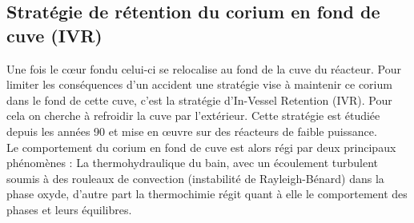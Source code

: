 
\subsection{Stratégie de rétention du corium en fond de cuve (IVR)}
Une fois le c\oe ur fondu celui-ci se relocalise au fond de la cuve du réacteur. Pour limiter les conséquences d'un accident une stratégie vise à maintenir ce corium dans le fond de cette cuve, c'est la stratégie d'In-Vessel Retention (IVR). Pour cela on cherche à refroidir la cuve par l'extérieur. Cette stratégie est étudiée depuis les années 90 et mise en \oe uvre sur des réacteurs de faible puissance. \\
Le comportement du corium en fond de cuve est alors régi par deux principaux phénomènes :
La thermohydraulique du bain, avec un écoulement turbulent soumis à des rouleaux de convection (instabilité de Rayleigh-Bénard) dans la phase oxyde, d'autre part la thermochimie régit quant à elle le comportement des phases et leurs équilibres. \\
